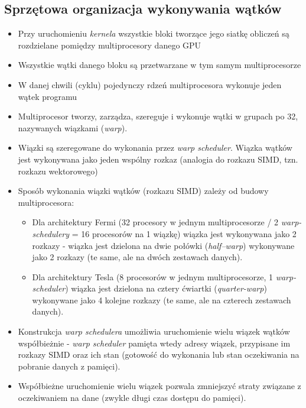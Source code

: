 		\subsection{Sprzętowa organizacja wykonywania wątków}
			\begin{itemize}
				\item Przy uruchomieniu \textit{kernela} wszystkie bloki tworzące jego siatkę obliczeń są rozdzielane pomiędzy multiprocesory danego GPU
				\item Wszystkie wątki danego bloku są przetwarzane w tym samym multiprocesorze
				\item W danej chwili (cyklu) pojedynczy rdzeń multiprocesora wykonuje jeden wątek programu
				\item Multiprocesor tworzy, zarządza, szereguje i wykonuje wątki w grupach po 32, nazywanych wiązkami (\emph{warp}).
				\item Wiązki są szeregowane do wykonania przez \emph{warp scheduler}. Wiązka wątków jest wykonywana jako jeden wspólny rozkaz (analogia do rozkazu SIMD, tzn. rozkazu wektorowego)
				\item Sposób wykonania wiązki wątków (rozkazu SIMD) zależy od budowy multiprocesora:
				\begin{itemize}
					\item Dla architektury Fermi (32 procesory w jednym multiprocesorze / 2 \emph{warp-schedulery} = 16 procesorów na 1 wiązkę) wiązka jest wykonywana jako 2 rozkazy - wiązka jest dzielona na dwie połówki (\emph{half–warp}) wykonywane jako 2 rozkazy (te same, ale na dwóch zestawach danych).
					\item Dla architektury Tesla (8 procesorów w jednym multiprocesorze, 1 \emph{warp-scheduler}) wiązka jest dzielona na cztery ćwiartki (\emph{quarter-warp}) wykonywane jako 4 kolejne rozkazy (te same, ale na czterech zestawach danych).
				\end{itemize}
				\item Konstrukcja \emph{warp schedulera} umożliwia uruchomienie wielu wiązek wątków współbieżnie -\emph{ warp scheduler }pamięta wtedy adresy wiązek, przypisane im rozkazy SIMD oraz ich stan (gotowość do wykonania lub stan oczekiwania na pobranie danych z pamięci).
				\item Współbieżne uruchomienie wielu wiązek pozwala zmniejszyć straty związane z oczekiwaniem na dane (zwykle długi czas dostępu do pamięci).
			\end{itemize}

